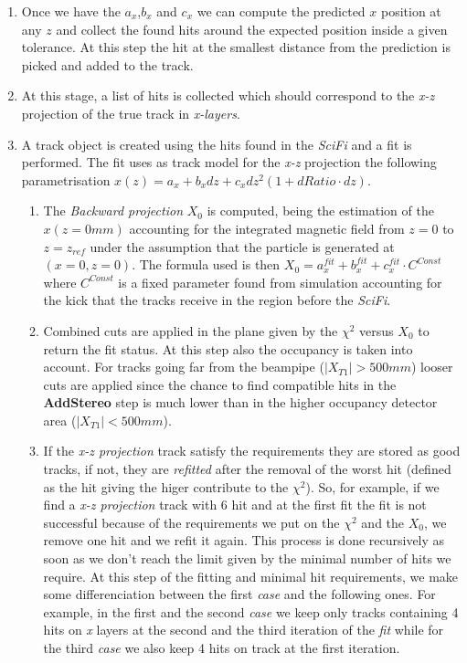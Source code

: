 \documentclass[paper=a4, fontsize=10pt]{scrartcl}
\numberwithin{equation}{section}		%
\numberwithin{figure}{section}			%
\numberwithin{table}{section}				%
\begin{document}
\begin{itemize}
\begin{enumerate}
      \item{Once we have the $a_{x}$,$b_{x}$ and $c_{x}$ we can compute the predicted $x$ position at any $z$ and collect the found hits around the expected position inside a given tolerance. At this step the hit at the smallest distance from the prediction is picked and added to the track.}
      \item{At this stage, a list of hits is collected which should correspond to the \textit{x-z} projection of the true track in \textit{x-layers}.}
      \item{A track object is created using the hits found in the \textit{SciFi} and a fit is performed. The fit uses as track model for the \textit{x-z} projection the following parametrisation $x(z)=a_{x}+b_{x}dz+c_{x}dz^{2}(1+dRatio\cdot dz)$.}
        \begin{enumerate}
           \item{The \textit{Backward projection} $X_{0}$ is computed, being the estimation of the $x(z=0 mm)$ accounting for the integrated magnetic field from $z=0$ to $z=z_{ref}$ under the assumption that the particle is generated at $(x=0,z=0)$. The formula used is then $X_{0} = a^{fit}_{x}+b^{fit}_{x}+c^{fit}_{x} \cdot C^{Const}$ where $C^{Const}$ is a fixed parameter found from simulation accounting for the kick that the tracks receive in the region before the \textit{SciFi}. }
           \item{Combined cuts are applied in the plane given by the $\chi^{2}$ versus $X_{0}$ to return the fit status. At this step also the occupancy is taken into account. For tracks going far from the beampipe ($\left| X_{T1} \right| > 500 mm$) looser cuts are applied since the chance to find compatible hits in the \textbf{AddStereo} step is much lower than in the higher occupancy detector area ($\left| X_{T1} \right| <500 mm$).}
           \item{If the \textit{x-z projection} track satisfy the requirements they are stored as good tracks, if not, they are \textit{refitted} after the removal of the worst hit (defined as the hit giving the higer contribute to the $\chi^{2}$). So, for example, if we find a \textit{x-z projection} track with 6 hit and at the first fit the fit is not successful because of the requirements we put on the $\chi^{2}$ and the $X_{0}$, we remove one hit and we refit it again. This process is done recursively as soon as we don't reach the limit given by the minimal number of hits we require. At this step of the fitting and minimal hit requirements, we make some differenciation between the first \textit{case} and the following ones. For example, in the first and the second \textit{case} we keep only tracks containing 4 hits on \textit{x} layers at the second and the third iteration of the \textit{fit} while for the third \textit{case} we also keep 4 hits on track at the first iteration.}

\end{enumerate}
\end{enumerate}
\end{itemize}
\end{document}
